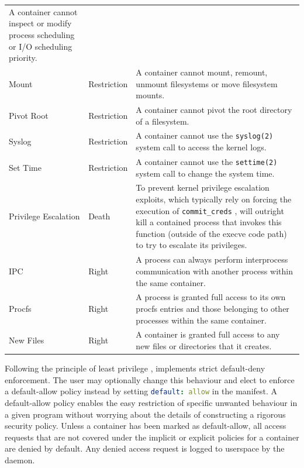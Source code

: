 \begin{longtable}[c]{llp{25em}}
    A container cannot inspect or modify process scheduling or I/O scheduling priority. \\
  Mount & Restriction &
    A container cannot mount, remount, unmount filesystems or move filesystem mounts. \\
  Pivot Root & Restriction &
    A container cannot pivot the root directory of a filesystem. \\
  Syslog & Restriction &
    A container cannot use the \texttt{syslog(2)} system call to access the kernel logs. \\
  Set Time & Restriction &
    A container cannot use the \texttt{settime(2)} system call to change the system time. \\
  \midrule
  Privilege Escalation & Death &
    To prevent kernel privilege escalation exploits, which typically rely on forcing the execution of \texttt{commit\_creds} \cite{xin2018_container_security}, \bpfcontain{} will outright kill a contained process that invokes this function (outside of the execve code path) to try to escalate its privileges. \\
  \midrule
  IPC & Right &
    A process can always perform interprocess communication with another process within the same container. \\
  Procfs & Right &
    A process is granted full access to its own procfs entries and those belonging to other processes within the same container. \\
  New Files & Right &
    A container is granted full access to any new files or directories that it creates. \\
  \bottomrule
\end{longtable}
\endgroup

Following the principle of least privilege \cite{saltzer1975_protection}, \bpfcontain{} implements strict default-deny enforcement. The user may optionally change this behaviour and elect to enforce a default-allow policy instead by setting \lstinline[language=yaml]|default: allow| in the manifest. A default-allow policy enables the easy restriction of specific unwanted behaviour in a given program without worrying about the details of constructing a rigorous security policy.  Unless a container has been marked as default-allow, all access requests that are not covered under the implicit or explicit policies for a container are denied by default. Any denied access request is logged to userspace by the \bpfcontain{} daemon. %

